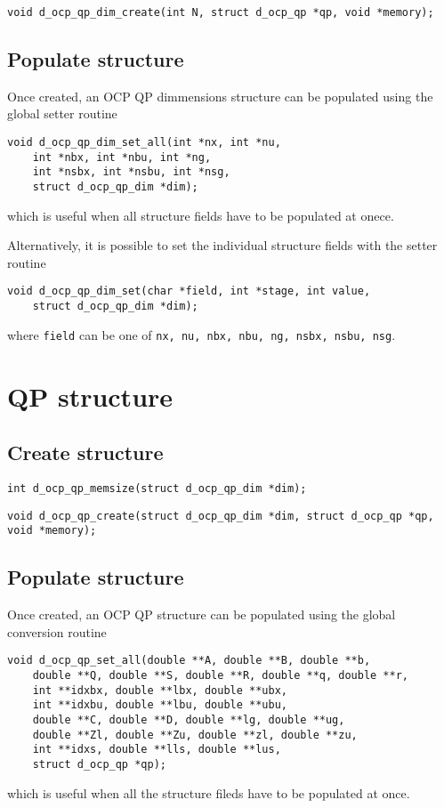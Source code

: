 \documentclass[a4paper]{report}
\begin{document}
\begin{verbatim}
void d_ocp_qp_dim_create(int N, struct d_ocp_qp *qp, void *memory);
\end{verbatim}

\subsection{Populate structure}

Once created, an OCP QP dimmensions structure can be populated using the global setter routine
\begin{verbatim}
void d_ocp_qp_dim_set_all(int *nx, int *nu,
    int *nbx, int *nbu, int *ng,
    int *nsbx, int *nsbu, int *nsg,
    struct d_ocp_qp_dim *dim);
\end{verbatim}
which is useful when all structure fields have to be populated at onece.

Alternatively, it is possible to set the individual structure fields with the setter routine
\begin{verbatim}
void d_ocp_qp_dim_set(char *field, int *stage, int value,
    struct d_ocp_qp_dim *dim);
\end{verbatim}
where {\tt field} can be one of {\tt nx, nu, nbx, nbu, ng, nsbx, nsbu, nsg}.

\section{QP structure}

\subsection{Create structure}

\begin{verbatim}
int d_ocp_qp_memsize(struct d_ocp_qp_dim *dim);
\end{verbatim}

\begin{verbatim}
void d_ocp_qp_create(struct d_ocp_qp_dim *dim, struct d_ocp_qp *qp, void *memory);
\end{verbatim}

\subsection{Populate structure}

Once created, an OCP QP structure can be populated using the global conversion routine
\begin{verbatim}
void d_ocp_qp_set_all(double **A, double **B, double **b, 
    double **Q, double **S, double **R, double **q, double **r, 
    int **idxbx, double **lbx, double **ubx, 
    int **idxbu, double **lbu, double **ubu, 
    double **C, double **D, double **lg, double **ug, 
    double **Zl, double **Zu, double **zl, double **zu, 
    int **idxs, double **lls, double **lus,
    struct d_ocp_qp *qp);
\end{verbatim}
which is useful when all the structure fileds have to be populated at once.
\end{document}
